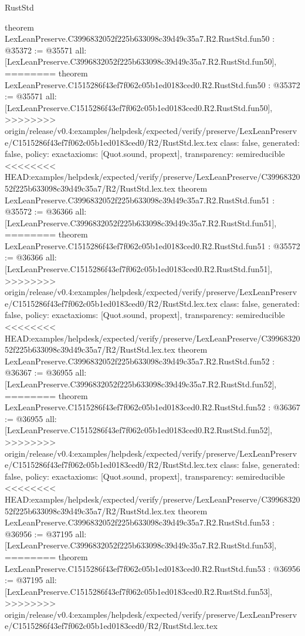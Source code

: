 \begin{lexlean}{RustStd}
\begin{coremodule}
{\begin{coremodule}
{{{{{{{{{{{{{{{{{{{{{{{{{{{{{{{{{{{{{{{{{{{{{{{{{{{{theorem LexLeanPreserve.C3996832052f225b633098c39d49c35a7.R2.RustStd.fun50 : @35372 := @35571 {
  all: [LexLeanPreserve.C3996832052f225b633098c39d49c35a7.R2.RustStd.fun50],
========
theorem LexLeanPreserve.C1515286f43ef7f062c05b1ed0183ced0.R2.RustStd.fun50 : @35372 := @35571 {
  all: [LexLeanPreserve.C1515286f43ef7f062c05b1ed0183ced0.R2.RustStd.fun50],
>>>>>>>> origin/release/v0.4:examples/helpdesk/expected/verify/preserve/LexLeanPreserve/C1515286f43ef7f062c05b1ed0183ced0/R2/RustStd.lex.tex
  class: false,
  generated: false,
  policy: exact{axioms: [Quot.sound, propext]},
  transparency: semireducible
}
<<<<<<<< HEAD:examples/helpdesk/expected/verify/preserve/LexLeanPreserve/C3996832052f225b633098c39d49c35a7/R2/RustStd.lex.tex
theorem LexLeanPreserve.C3996832052f225b633098c39d49c35a7.R2.RustStd.fun51 : @35572 := @36366 {
  all: [LexLeanPreserve.C3996832052f225b633098c39d49c35a7.R2.RustStd.fun51],
========
theorem LexLeanPreserve.C1515286f43ef7f062c05b1ed0183ced0.R2.RustStd.fun51 : @35572 := @36366 {
  all: [LexLeanPreserve.C1515286f43ef7f062c05b1ed0183ced0.R2.RustStd.fun51],
>>>>>>>> origin/release/v0.4:examples/helpdesk/expected/verify/preserve/LexLeanPreserve/C1515286f43ef7f062c05b1ed0183ced0/R2/RustStd.lex.tex
  class: false,
  generated: false,
  policy: exact{axioms: [Quot.sound, propext]},
  transparency: semireducible
}
<<<<<<<< HEAD:examples/helpdesk/expected/verify/preserve/LexLeanPreserve/C3996832052f225b633098c39d49c35a7/R2/RustStd.lex.tex
theorem LexLeanPreserve.C3996832052f225b633098c39d49c35a7.R2.RustStd.fun52 : @36367 := @36955 {
  all: [LexLeanPreserve.C3996832052f225b633098c39d49c35a7.R2.RustStd.fun52],
========
theorem LexLeanPreserve.C1515286f43ef7f062c05b1ed0183ced0.R2.RustStd.fun52 : @36367 := @36955 {
  all: [LexLeanPreserve.C1515286f43ef7f062c05b1ed0183ced0.R2.RustStd.fun52],
>>>>>>>> origin/release/v0.4:examples/helpdesk/expected/verify/preserve/LexLeanPreserve/C1515286f43ef7f062c05b1ed0183ced0/R2/RustStd.lex.tex
  class: false,
  generated: false,
  policy: exact{axioms: [Quot.sound, propext]},
  transparency: semireducible
}
<<<<<<<< HEAD:examples/helpdesk/expected/verify/preserve/LexLeanPreserve/C3996832052f225b633098c39d49c35a7/R2/RustStd.lex.tex
theorem LexLeanPreserve.C3996832052f225b633098c39d49c35a7.R2.RustStd.fun53 : @36956 := @37195 {
  all: [LexLeanPreserve.C3996832052f225b633098c39d49c35a7.R2.RustStd.fun53],
========
theorem LexLeanPreserve.C1515286f43ef7f062c05b1ed0183ced0.R2.RustStd.fun53 : @36956 := @37195 {
  all: [LexLeanPreserve.C1515286f43ef7f062c05b1ed0183ced0.R2.RustStd.fun53],
>>>>>>>> origin/release/v0.4:examples/helpdesk/expected/verify/preserve/LexLeanPreserve/C1515286f43ef7f062c05b1ed0183ced0/R2/RustStd.lex.tex
}}}}}}}}}}}}}}}}}}}}}}}}}}}}}}}}}}}}}}}}}}}}}}}}}}}}}}}}}
\end{coremodule}}
\end{coremodule}
\end{lexlean}
